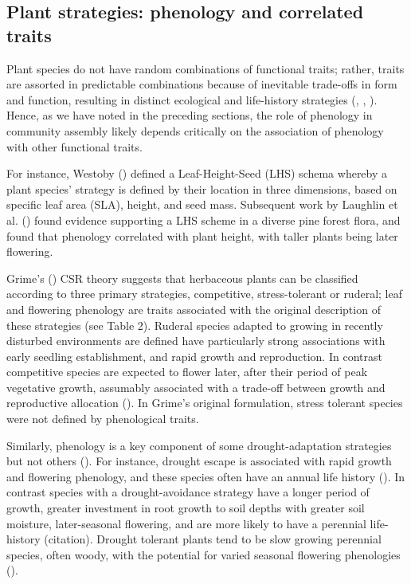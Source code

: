\documentclass[11pt]{article}
\begin{document}
  

\subsection*{Plant strategies: phenology and correlated traits}

Plant species do not have random combinations of functional traits; rather, traits are assorted in predictable combinations because of inevitable trade-offs in form and function, resulting in distinct ecological and life-history strategies (\citet{stearns1998evolution},  \citet{adler2014functional}, \citet{westoby2002plant}). Hence, as we have noted in the preceding sections, the role of phenology in community assembly likely depends critically on the association of phenology with other functional traits.

For instance, Westoby (\citet{westoby1998leaf}) defined a Leaf-Height-Seed (LHS) schema whereby a plant species’ strategy is defined by their location in three dimensions, based on specific leaf area (SLA), height, and seed mass. Subsequent work by Laughlin et al. (\citet{laughlin2010multi}) found evidence supporting a LHS scheme in a diverse pine forest flora, and found that phenology correlated with plant height, with taller plants being later flowering. 

 Grime’s (\citet{grime1977evidence}) CSR theory suggests that herbaceous plants can be classified according to three primary strategies, competitive, stress-tolerant or ruderal; leaf and flowering phenology are traits associated with the original description of these strategies (see Table 2). Ruderal species adapted to growing in recently disturbed environments are defined have particularly strong associations with early seedling establishment, and rapid growth and reproduction. In contrast competitive species are expected to flower later, after their period of peak vegetative growth, assumably associated with a trade-off between growth and reproductive allocation (\citet{law1979cost}). In Grime’s original formulation, stress tolerant species were not defined by phenological traits.

 Similarly, phenology is a key component of some drought-adaptation strategies but not others (\citet{kooyers2015evolution}). For instance, drought escape is associated with rapid growth and flowering phenology, and these species often have an annual life history (\citet{fox1992evolution}). In contrast species with a drought-avoidance strategy have a longer period of growth, greater investment in root growth to soil depths with greater soil moisture, later-seasonal flowering, and are more likely to have a perennial life-history (citation). Drought tolerant plants tend to be slow growing perennial species, often woody, with the potential for varied seasonal flowering phenologies (\citet{williams1997leaf}).
\end{document}
